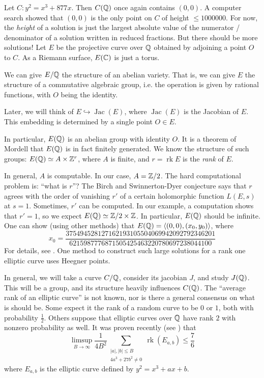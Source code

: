 \documentclass{article}
\begin{document}
\begin{example}
Let $C:y^2=x^3+877 x$. Then $C(\mathbb{Q})$ once again contains $(0,0)$. A 
computer search showed that $(0,0)$ is the only point on $C$ of height 
$\leqslant 1000000$. For now, the \emph{height} of a solution is just the 
largest absolute value of the numerator / denominator of a solution written 
in reduced fractions. But there should be more solutions! Let $E$ be the 
projective curve over $\mathbb{Q}$ obtained by adjoining a point $O$ to $C$. 
As a Riemann surface, $E(\mathbb{C})$ is just a torus. 

We can give $E/\mathbb{Q}$ the structure of an abelian variety. That is, 
we can give $E$ the structure of a commutative algebraic group, i.e. the 
operation is given by rational functions, with $O$ being the identity. 

Later, we will think of $E\hookrightarrow \operatorname{Jac}(E)$, where 
$\operatorname{Jac}(E)$ is the Jacobian of $E$. This embedding is determined 
by a single point $O\in E$. 

In particular, $E(\mathbb{Q})$ is an abelian group with identity $O$. It is 
a theorem of Mordell that $E(\mathbb{Q})$ is in fact finitely generated. We 
know the structure of such groups: $E(\mathbb{Q})\simeq A\times \mathbb{Z}^r$, 
where $A$ is finite, and $r=\operatorname{rk} E$ is the \emph{rank} of $E$. 

In general, $A$ is computable. In our case, $A=\mathbb{Z}/2$. The hard 
computational problem is: ``what is $r$''? The Birch and Swinnerton-Dyer 
conjecture says that $r$ agrees with the order of vanishing $r'$ of a certain 
holomorphic function $L(E,s)$ at $s=1$. Sometimes, $r'$ can be computed.  
In our example, a computation shows that $r'=1$, so we expect 
$E(\mathbb{Q})\simeq \mathbb{Z}/2\times\mathbb{Z}$. In particular, 
$E(\mathbb{Q})$ should be infinite. One can show (using other methods) that 
$E(\mathbb{Q})=\langle (0,0),(x_0,y_0)\rangle$, where 
\[
  x_0 = \frac{37 5494 5281 2716 2193 1055 0406 9942 0927 9234 6201}{6215 9877 7687 1505 4254 6322 0780 6972 3804 4100}
\]
For details, see \cite{br84}. One method to construct such large solutions for 
a rank one elliptic curve uses Heegner points. 
\end{example}

In general, we will take a curve $C/\mathbb{Q}$, consider its jacobian $J$, 
and study $J(\mathbb{Q})$. This will be a group, and its structure heavily 
influences $C(\mathbb{Q})$. The ``average rank of an elliptic curve'' is not 
known, nor is there a general consensus on what is should be. Some expect it 
the rank of a random curve to be $0$ or $1$, both with probability 
$\frac 1 2$. Others suppose that elliptic curves over $\mathbb{Q}$ have rank 
$2$ with nonzero probability as well. It was proven recently (see 
\cite[\S 1]{bh10}) that 
\[
  \limsup_{B\to\infty} \frac{1}{4 B^2} \sum_{\substack{|a|,|b|\leqslant B \\ 4 a^3+27 b^2\ne 0}} \operatorname{rk}(E_{a,b}) \leqslant\frac 7 6
\]
where $E_{a,b}$ is the elliptic curve defined by $y^2=x^3 +a x+b$.
\end{document}
